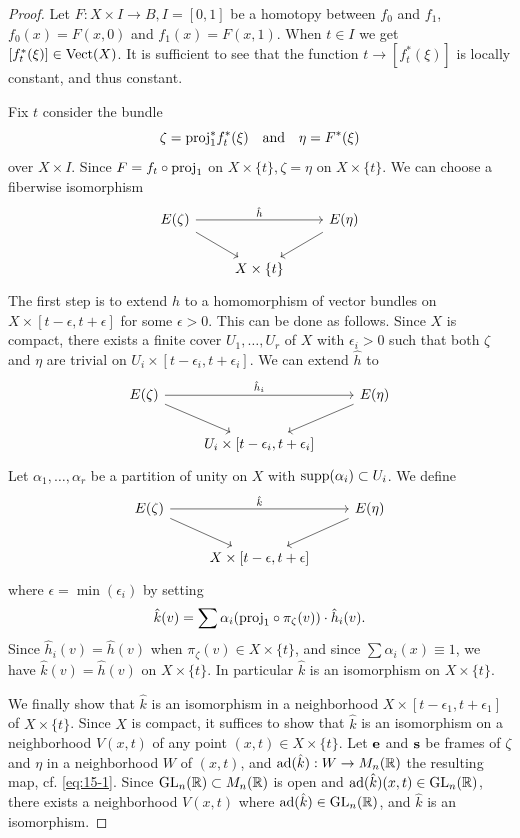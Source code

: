 \begin{proof}
  Let $F:X\times I\to B, I=[0, 1]$ be a homotopy between $f_0$ and $f_1$,
  $f_0(x) = F(x,0)$ and $f_1(x) = F(x,1)$. When $t\in I$ we get $[f^*_t(\xi)]\in\mathrm{Vect}(X)$.
  It is sufficient to see that the function $t\to [f^*_t(\xi)]$ is locally constant, and thus
  constant.

  Fix $t$ consider the bundle
  \[
    \zeta = \mathrm{proj}_1^*f^*_t(\xi) \quad \text{and}\quad 
    \eta = F^*(\xi)
  \]
  over $X\times I$. Since $F = f_t\circ \mathrm{proj}_1$ on $X\times \{t\}, \zeta=\eta$ on $X\times \{t\}$. We can 
  choose a fiberwise isomorphism
  \[\begin{tikzcd}
    E(\zeta) \arrow[rr, "\hat h"] \arrow[dr, ""] & & E(\eta) \arrow[dl, ""] \\
    & X\times\{t\} &
  \end{tikzcd}\]
  The first step is to extend $\hat h$ to a homomorphism of vector bundles on $X\times [t-\epsilon, t+\epsilon]$
  for some $\epsilon > 0$. This can be done as follows. Since $X$ is compact, there
  exists a finite cover $U_1, \ldots, U_r$ of $X$ with $\epsilon_i > 0$ such that both $\zeta$ and $\eta$ 
  are trivial on $U_i\times [t - \epsilon_i, t + \epsilon_i]$. We can extend $\hat h$ to
  \[\begin{tikzcd}
    E(\zeta) \arrow[rr, "\hat h_i"] \arrow[dr, ""] & & E(\eta) \arrow[dl, ""] \\
    & U_i\times [t - \epsilon_i, t + \epsilon_i] &
  \end{tikzcd}\]
  Let $\alpha_1, \ldots, \alpha_r$ be a partition of unity on $X$ with $\operatorname{supp}(\alpha_i)\subset U_i$. We define 
  \[\begin{tikzcd}
    E(\zeta) \arrow[rr, "\hat k"] \arrow[dr, ""] & & E(\eta) \arrow[dl, ""] \\
    & X\times [t - \epsilon, t + \epsilon] &
  \end{tikzcd}\]
  where $\epsilon=\min(\epsilon_i)$ by setting
  \[
    \hat k(v) = \sum \alpha_i(\mathrm{proj}_1\circ \pi_\zeta(v))\cdot \hat h_i(v).
  \]
  Since $\hat h_i(v) = \hat h(v)$ when $\pi_\zeta(v)\in X\times \{t\}$, and since $\sum \alpha_i(x)\equiv 1$,
  we have $\hat k(v)=\hat h(v)$ on $X\times \{t\}$. In particular $\hat k$ is an isomorphism on $X\times\{t\}$.

  We finally show that $\hat k$ is an isomorphism in a neighborhood $X\times [t-\epsilon_1, t+\epsilon_1]$
  of $X\times \{t\}$. Since $X$ is compact, it suffices to show that $\hat k$ is an isomorphism on a neighborhood 
  $V(x, t)$ of any point $(x, t)\in X\times \{t\}$. Let $\mathbf{e}$ and $\mathbf{s}$ be frames of $\zeta$
  and $\eta$ in a neighborhood $W$ of $(x, t)$, and $\mathrm{ad}(\hat k):W\to M_n({\mathbb{R}})$ the resulting map, cf. \eqref{eq:15-1}.
  Since $\mathrm{GL}_n({\mathbb{R}})\subset M_n({\mathbb{R}})$ is open and $\mathrm{ad}(\hat k)(x, t)\in \mathrm{GL}_n({\mathbb{R}})$, there exists a neighborhood
  $V(x, t)$ where $\mathrm{ad}(\hat k)\in \mathrm{GL}_n({\mathbb{R}})$, and $\hat k$ is an isomorphism.
\end{proof}

